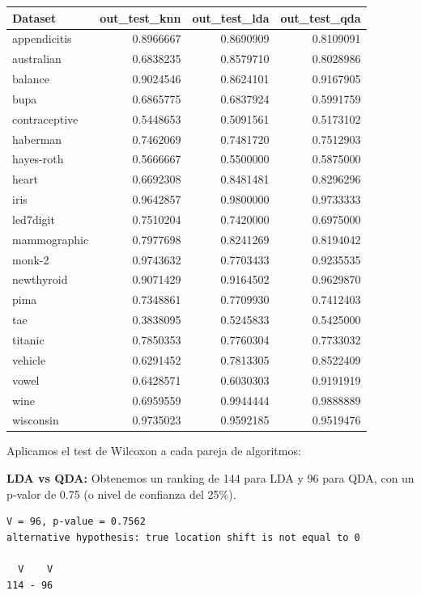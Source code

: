 \begin{tabular}{l|r|r|r}
\hline
Dataset & out\_test\_knn & out\_test\_lda & out\_test\_qda\\
\hline
appendicitis & 0.8966667 & 0.8690909 & 0.8109091\\
\hline
australian & 0.6838235 & 0.8579710 & 0.8028986\\
\hline
balance & 0.9024546 & 0.8624101 & 0.9167905\\
\hline
bupa & 0.6865775 & 0.6837924 & 0.5991759\\
\hline
contraceptive & 0.5448653 & 0.5091561 & 0.5173102\\
\hline
haberman & 0.7462069 & 0.7481720 & 0.7512903\\
\hline
hayes-roth & 0.5666667 & 0.5500000 & 0.5875000\\
\hline
heart & 0.6692308 & 0.8481481 & 0.8296296\\
\hline
iris & 0.9642857 & 0.9800000 & 0.9733333\\
\hline
led7digit & 0.7510204 & 0.7420000 & 0.6975000\\
\hline
mammographic & 0.7977698 & 0.8241269 & 0.8194042\\
\hline
monk-2 & 0.9743632 & 0.7703433 & 0.9235535\\
\hline
newthyroid & 0.9071429 & 0.9164502 & 0.9629870\\
\hline
pima & 0.7348861 & 0.7709930 & 0.7412403\\
\hline
tae & 0.3838095 & 0.5245833 & 0.5425000\\
\hline
titanic & 0.7850353 & 0.7760304 & 0.7733032\\
\hline
vehicle & 0.6291452 & 0.7813305 & 0.8522409\\
\hline
vowel & 0.6428571 & 0.6030303 & 0.9191919\\
\hline
wine & 0.6959559 & 0.9944444 & 0.9888889\\
\hline
wisconsin & 0.9735023 & 0.9592185 & 0.9519476\\
\hline
\end{tabular}

\vspace{\baselineskip}

Aplicamos el test de Wilcoxon a cada pareja de algoritmos:

\vspace{\baselineskip}

\textbf{LDA vs QDA:} Obtenemos un ranking de 144 para LDA y 96 para QDA, con un p-valor de 0.75 (o nivel de confianza del 25\%).
\begin{verbatim}
V = 96, p-value = 0.7562
alternative hypothesis: true location shift is not equal to 0

  V    V
114 - 96 
\end{verbatim}

